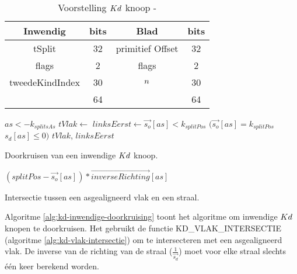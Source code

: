 \begin{table}
    \centering
    \begin{tabular}{@{}|c|c|c|c|@{}} \toprule      
    Inwendig & bits & Blad & bits \\ \midrule
    tSplit & 32 & primitief Offset & 32 \\
    flags  & 2  &  flags   & 2    \\
    tweedeKindIndex & 30 & $n$ & 30 \\ \hline \hline
    & 64 & & 64    \\ \bottomrule
    \end{tabular}
    \caption[Voorstelling $\symKd$ knoop]{Voorstelling $\symKd$ knoop - \small }
    \label{tab:voorstelling-kd-knoop}
\end{table}            
\begin{dutchalgorithm}
    \begin{algorithmic}       
            \State $as <- k_{splitsAs}$
            \State $tVlak \gets $ 
            \State $linksEerst \gets \vec{s_o}[as] < k_{splitPos}$ \Or $(\vec{s_o}[as] = k_{splitPos}$ \And $s_d[as] \leq 0)$
            \State \Return $tVlak$, $linksEerst$
        \EndFunction
    \end{algorithmic}
    \caption{Doorkruisen van een inwendige $\symKd$ knoop.}
    \label{alg:kd-inwendige-doorkruising}
\end{dutchalgorithm}
\begin{dutchalgorithm}
    \begin{algorithmic}       
            \State \Return $(splitPos - \vec{s_o}[as]) * \vec{inverseRichting}[as]$
        \EndFunction
    \end{algorithmic}
    \caption{Intersectie tussen een asgealigneerd vlak en een straal.}
    \label{alg:kd-vlak-intersectie}
\end{dutchalgorithm}
Algoritme \ref{alg:kd-inwendige-doorkruising} toont het algoritme om inwendige $\symKd$ knopen te doorkruisen.
Het gebruikt de functie KD\_VLAK\_INTERSECTIE (algoritme \ref{alg:kd-vlak-intersectie}) om te intersecteren met een asgealigneerd vlak.
De inverse van de richting van de straal ($\frac{1}{\vec{s_d}}$) moet voor elke straal slechts één keer berekend worden.\\

